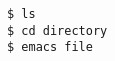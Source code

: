 \documentclass{article}
\begin{document}
\begin{verbatim}
$ ls
$ cd directory
$ emacs file
\end{verbatim}
\end{document}
